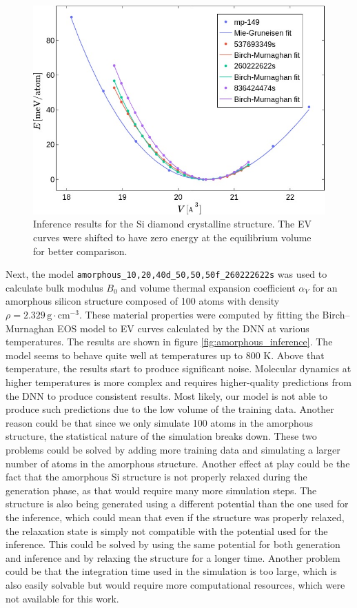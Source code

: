 \begin{figure}
  \begin{center}
    \includegraphics[width=.8\textwidth]{
      asset/crystalline_ev_curves.jpg
    }
  \end{center}
  \caption{Inference results for the Si diamond crystalline structure. The EV
  curves were shifted to have zero energy at the equilibrium volume for better
  comparison.}
  \label{fig:crystalline_inference}
\end{figure}

Next, the model \texttt{amorphous\_10,20,40d\_50,50,50f\_260222622s} was used
to calculate bulk modulus $B_0$ and volume thermal expansion coefficient
$\alpha_{V}$ for an amorphous silicon structure composed of 100 atoms with
density $\rho = 2.329 \, \mathrm{g} \cdot \mathrm{cm}^{-3}$. These material
properties were computed by fitting the Birch--Murnaghan EOS model to EV
curves calculated by the DNN at various temperatures. The results are shown in
figure \ref{fig:amorphous_inference}. The model seems to behave quite well at
temperatures up to 800 K. Above that temperature, the results start to produce
significant noise. Molecular dynamics at higher temperatures is more complex
and requires higher-quality predictions from the DNN to produce consistent
results. Most likely, our model is not able to produce such predictions
due to the low volume of the training data. Another reason could be that since
we only simulate 100 atoms in the amorphous structure, the statistical nature
of the simulation breaks down. These two problems could be solved by adding
more training data and simulating a larger number of atoms in the amorphous
structure. Another effect at play could be the fact that the amorphous Si
structure is not properly relaxed during the generation phase, as that would
require many more simulation steps. The structure is also being generated
using a different potential than the one used for the inference, which could
mean that even if the structure was properly relaxed, the relaxation state is
simply not compatible with the potential used for the inference. This could be
solved by using the same potential for both generation and inference and
by relaxing the structure for a longer time. Another problem could be that the
integration time used in the simulation is too large, which is also easily
solvable but would require more computational resources, which were not
available for this work.

